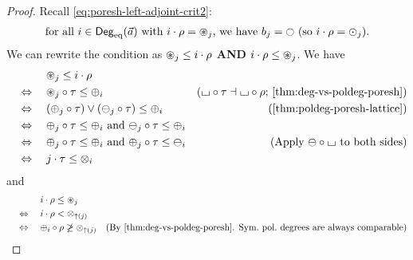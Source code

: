 \documentclass[a4paper]{memoir}
\begin{document}
\begin{proof}
	Recall \cref{eq:poresh-left-adjoint-crit2}:
	\begin{align*}
		\text{for all } i \in \Degeq(\vec a) \text{ with } i \cdot \rho = \isopol_j \text{, we have } b_j = \npolar \text{ (so $i \cdot \rho = \nonpol_j$)}.
	\end{align*}
	We can rewrite the condition as ${\oast}_j \leq i \cdot \rho$ \textbf{AND} $i \cdot \rho \leq {\oast}_j$.
	We have
	\begin{align*}
		&\quad\mathrel{\phantom{\Leftrightarrow}}\quad
		\isopol_j \leq i \cdot \rho
		\\ &\quad\Leftrightarrow\quad
		\isopol_j \circ \tau \leq \pospol_i
		& \text{($\loch \circ \tau \dashv \loch \circ \rho$; \cref{thm:deg-vs-poldeg-poresh})}
		\\ &\quad\Leftrightarrow\quad
		(\pospol_j \circ \tau) \vee (\negpol_j \circ \tau) \leq \pospol_i
		& \text{(\Cref{thm:poldeg-poresh-lattice})}
		\\ &\quad\Leftrightarrow\quad
		\pospol_j \circ \tau \leq \pospol_i \text{ and }
		\negpol_j \circ \tau \leq \pospol_i
		\\ &\quad\Leftrightarrow\quad
		\pospol_j \circ \tau \leq \pospol_i \text{ and }
		\pospol_j \circ \tau \leq \negpol_i
		& \text{(Apply $\negpol \circ \loch$ to both sides)}
		\\ &\quad\Leftrightarrow\quad
		j \cdot \tau \leq \mixpol_i
	\end{align*}
	and
	\begin{align*}
		&\quad\mathrel{\phantom{\Leftrightarrow}}\quad
		i \cdot \rho \leq \isopol_j
		\\ &\quad\Leftrightarrow\quad
		i \cdot \rho < \mixpol_{\sucdeg(j)}
		\\ &\quad\Leftrightarrow\quad
		\pospol_i \circ \rho \not\geq \mixpol_{\sucdeg(j)}
		& \text{(By \cref{thm:deg-vs-poldeg-poresh}. Sym.\ pol.\ degrees are always comparable)}

\end{align*}
\end{proof}
\end{document}

